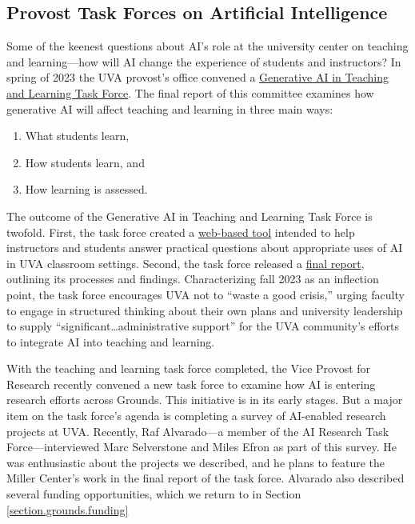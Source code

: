 \documentclass[12pt, oneside]{article}   	%
\begin{document}
\subsection{Provost Task Forces on Artificial Intelligence}
Some of the keenest questions about AI’s role at the university center on teaching and learning—how will AI change the experience of students and instructors?  In spring of 2023 the UVA provost’s office convened a \href{https://provost.virginia.edu/subsite/genai}{Generative AI in Teaching and Learning Task Force}.  The final report of this committee examines how generative AI will affect teaching and learning in three main ways:
\begin{enumerate}
\item What students learn,
\item How students learn, and
\item How learning is assessed.
\end{enumerate}
The outcome of the Generative AI in Teaching and Learning Task Force is twofold.  First, the task force created a \href{https://provost.virginia.edu/subsite/genai/faqs}{web-based tool} intended to help instructors and students  answer practical questions about appropriate uses of AI in UVA classroom settings.  Second, the task force released a \href{https://provost.virginia.edu/subsite/genai/task-force-report}{final report}, outlining its processes and findings.  Characterizing fall 2023 as an inflection point, the task force encourages UVA not to “waste a good crisis,” urging faculty to engage in structured thinking about their own plans and university leadership to supply “significant…administrative support” for the UVA community’s efforts to integrate AI into teaching and learning.

With the teaching and learning task force completed, the Vice Provost for Research recently convened a new task force to examine how AI is entering research efforts across Grounds.  This initiative is in its early stages.  But a major item on the task force's agenda is completing a survey of AI-enabled research projects at UVA.  Recently, Raf Alvarado---a member of the AI Research Task Force---interviewed Marc Selverstone and Miles Efron as part of this survey.  He was enthusiastic about the projects we described, and he plans to feature the Miller Center's work in the final report of the task force.  Alvarado also described several funding opportunities, which we return to in Section \ref{section.grounds.funding}
\end{document}
